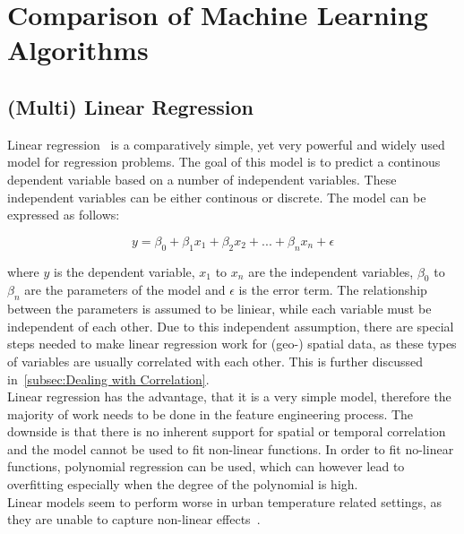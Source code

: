 
\section{Comparison of Machine Learning Algorithms}
\label{sec:comparison ml algorithms}

\subsection{(Multi) Linear Regression}
\label{subsec: linear regression}

Linear regression~\cite{montgomery2021introduction} is a comparatively simple, yet very powerful and widely used model for regression problems. The goal of this model is to predict a continous dependent variable based on a number of independent variables. These independent variables can be either continous or discrete. The model can be expressed as follows:

\begin{equation}
    y = \beta_0 + \beta_1 x_1 + \beta_2 x_2 + ... + \beta_n x_n + \epsilon
\end{equation}

where $y$ is the dependent variable, $x_1$ to $x_n$ are the independent variables, $\beta_0$ to $\beta_n$ are the parameters of the model and $\epsilon$ is the error term. The relationship between the parameters is assumed to be liniear, while each variable must be independent of each other. Due to this independent assumption, there are special steps needed to make linear regression work for (geo-) spatial data, as these types of variables are usually correlated with each other. This is further discussed in~\ref{subsec:Dealing with Correlation}.\\
Linear regression has the advantage, that it is a very simple model, therefore the majority of work needs to be done in the feature engineering process. The downside is that there is no inherent support for spatial or temporal correlation and the model cannot be used to fit non-linear functions. In order to fit no-linear functions, polynomial regression can be used, which can however lead to overfitting especially when the degree of the polynomial is high.\\
Linear models seem to perform worse in urban temperature related settings, as they are unable to capture non-linear effects~\cite{voelkel2017towards}.

